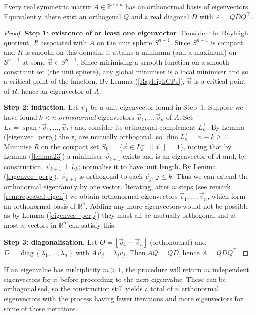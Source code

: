\begin{theorem}\label{SpectralThm}
Every real symmetric matrix $A\in\mathbb R^{n\times n}$ has an orthonormal basis of eigenvectors. Equivalently, there exist an orthogonal $Q$ and a real diagonal $D$ with $A=QDQ^{\top}$.
\end{theorem}
\begin{proof}
\textbf{Step 1: existence of at least one eigenvector.}
Consider the Rayleigh quotient, $R$ associated with $A$ on the unit sphere $S^{n-1}$.  Since $S^{n-1}$ is compact and $R$ is smooth on this domain, it attains a minimum (and a maximum) on $S^{n-1}$ at some $\vec{u}\in S^{n-1}$. Since minimising a smooth function on a smooth constraint set (the unit sphere), any global minimiser is a local minimiser and so a critical point of the function. By Lemma (\ref{RayleighCPs}), $\vec{u}$ is a critical point of $R$, hence an eigenvector of $A$.

\textbf{Step 2: induction.}
Let $\vec{v}_{1}$ be a unit eigenvector found in Step~1.  Suppose we have found $k<n$ \emph{orthonormal} eigenvectors $\vec{v}_{1},\dots,\vec{v}_{k}$ of $A$. Set $L_{k}=\operatorname{span}\{\vec{v}_{1},\dots,\vec{v}_{k}\}$ and consider its orthogonal complement $L_{k}^{\perp}$.  By Lemma (\ref{eigenvec_perp}) the $v_{j}$ are mutually orthogonal, so $\dim L_{k}^{\perp}=n-k\ge1$. Minimise $R$ on the compact set $S_{k}:=\{\vec{x}\in L_{k}^{\perp}:\|\vec{x}\|=1\}$, noting that by Lemma (\ref{lemma23}) a minimiser $\vec{v}_{k+1}$ exists and is an eigenvector of $A$ and, by construction, $\vec{v}_{k+1}\perp L_{k}$; normalise it to have unit length. By Lemma (\ref{eigenvec_perp}), $\vec{v}_{k+1}$ is orthogonal to each $\vec{v}_{j}$, $j\le k$. Thus we can extend the orthonormal eigenfamily by one vector.  Iterating, after $n$ steps (see remark \ref{rem:repeated-eigen}) we obtain orthonormal eigenvectors $\vec{v}_{1},\dots,\vec{v}_{n}$, which form an orthonormal basis of $\mathbb R^{n}$. Adding any more eigenvectors would not be possible as by Lemma (\ref{eigenvec_perp}) they must all be mutually orthogonal and at most $n$ vectors in $\mathbb{R}^n$ can satisfy this.

\textbf{Step 3: diagonalisation.}\label{step:diagonalisation}
Let $Q=[\vec{v}_{1}\ \cdots\ \vec{v}_{n}]$ (orthonormal) and $D=\operatorname{diag}(\lambda_{1},\dots,\lambda_{n})$ with $A\vec{v}_{j}=\lambda_{j}v_{j}$. Then $AQ=QD$, hence $A=QDQ^{\top}$.
\end{proof}
\begin{remark}\label{rem:repeated-eigen}
If an eigenvalue has multiplicity $m>1$, the procedure will return $m$ independent eigenvectors for it before proceeding to the next eigenvalue. These can be orthogonalised, so the construction still yields a total of $n$ orthonormal eigenvectors with the process having fewer iterations and more eigenvectors for some of those iterations.
\end{remark}


